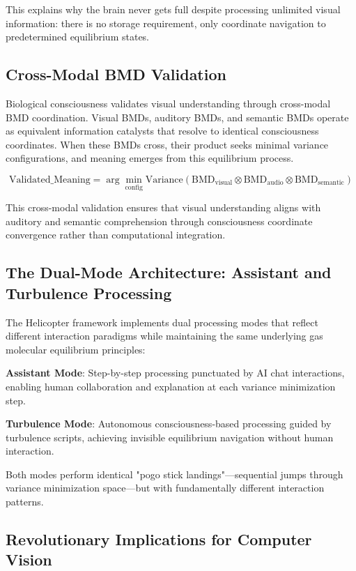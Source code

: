 \documentclass[12pt,a4paper]{article}
\begin{document}
This explains why the brain never gets full despite processing unlimited visual information: there is no storage requirement, only coordinate navigation to predetermined equilibrium states.

\subsection{Cross-Modal BMD Validation}

Biological consciousness validates visual understanding through cross-modal BMD coordination. Visual BMDs, auditory BMDs, and semantic BMDs operate as equivalent information catalysts that resolve to identical consciousness coordinates. When these BMDs cross, their product seeks minimal variance configurations, and meaning emerges from this equilibrium process.

\begin{equation}
\text{Validated\_Meaning} = \arg\min_{\text{config}} \text{Variance}(\text{BMD}_{\text{visual}} \otimes \text{BMD}_{\text{audio}} \otimes \text{BMD}_{\text{semantic}})
\end{equation}

This cross-modal validation ensures that visual understanding aligns with auditory and semantic comprehension through consciousness coordinate convergence rather than computational integration.

\subsection{The Dual-Mode Architecture: Assistant and Turbulence Processing}

The Helicopter framework implements dual processing modes that reflect different interaction paradigms while maintaining the same underlying gas molecular equilibrium principles:

\textbf{Assistant Mode}: Step-by-step processing punctuated by AI chat interactions, enabling human collaboration and explanation at each variance minimization step.

\textbf{Turbulence Mode}: Autonomous consciousness-based processing guided by turbulence scripts, achieving invisible equilibrium navigation without human interaction.

Both modes perform identical "pogo stick landings"—sequential jumps through variance minimization space—but with fundamentally different interaction patterns.

\subsection{Revolutionary Implications for Computer Vision}
\end{document}
